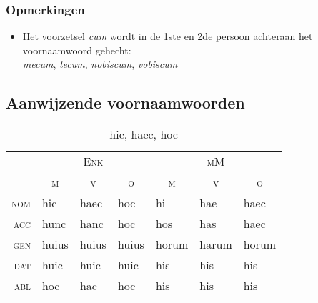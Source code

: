 \documentclass[12pt,a4paper]{article}
\begin{document}
\subsubsection{Opmerkingen}

\begin{itemize}
    \item Het voorzetsel \emph{cum} wordt in de 1ste en 2de persoon achteraan het voornaamwoord gehecht: \\ \emph{mecum}, \emph{tecum}, \emph{nobiscum}, \emph{vobiscum}
\end{itemize}

\subsection{Aanwijzende voornaamwoorden}

\begin{table}[H]
\centering
\begin{tabular}{ r | l l l | l l l }
\toprule
 & \multicolumn{3}{c|}{\textsc{Enk}} & \multicolumn{3}{c}{\textsc{mM}} \\
 & \multicolumn{1}{c}{\textsc{m}} & \multicolumn{1}{c}{\textsc{v}} & \multicolumn{1}{c|}{\textsc{o}} & \multicolumn{1}{c}{\textsc{m}} & \multicolumn{1}{c}{\textsc{v}} & \multicolumn{1}{c}{\textsc{o}} \\ 
\midrule
\textsc{nom} & hic   & haec  & hoc   & hi    & hae   & haec  \\
\textsc{acc} & hunc  & hanc  & hoc   & hos   & has   & haec  \\
\textsc{gen} & huius & huius & huius & horum & harum & horum \\
\textsc{dat} & huic  & huic  & huic  & his   & his   & his   \\
\textsc{abl} & hoc   & hac   & hoc   & his   & his   & his   \\
\bottomrule
\end{tabular}
\caption{hic, haec, hoc}
\label{tab:hic}
\end{table}
\end{document}
